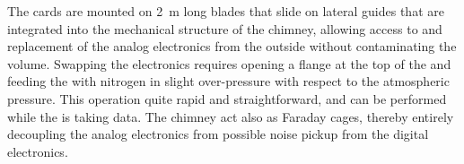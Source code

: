 The  cards are mounted on \SI{2}{m} long blades that slide on lateral guides that are integrated into the mechanical structure of the chimney, allowing access to and replacement of the analog  electronics from the outside without contaminating the \lar volume. 
Swapping the  electronics requires opening a flange at the top of the  and feeding the  with nitrogen in slight over-pressure with respect to the atmospheric pressure.  This operation quite rapid and straightforward, and can be performed while the  is taking data. The chimney act also as Faraday cages, thereby entirely decoupling the analog  electronics %
from possible noise pickup from the digital electronics.   



